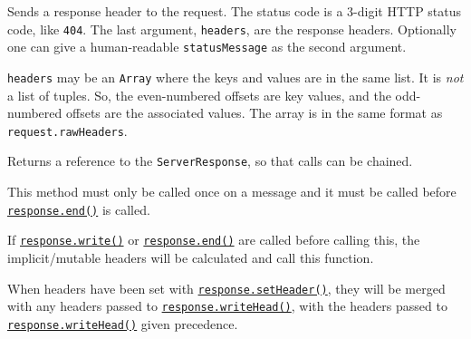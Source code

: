 Sends a response header to the request. The status code is a 3-digit
HTTP status code, like \texttt{404}. The last argument,
\texttt{headers}, are the response headers. Optionally one can give a
human-readable \texttt{statusMessage} as the second argument.

\texttt{headers} may be an \texttt{Array} where the keys and values are
in the same list. It is \emph{not} a list of tuples. So, the
even-numbered offsets are key values, and the odd-numbered offsets are
the associated values. The array is in the same format as
\texttt{request.rawHeaders}.

Returns a reference to the \texttt{ServerResponse}, so that calls can be
chained.

\begin{Shaded}
\begin{Highlighting}[]
\OperatorTok{=} \OperatorTok{;}
  \NormalTok{(}\OperatorTok{,}\NormalTok{ \{}
    \OperatorTok{:} \OperatorTok{,}
    \OperatorTok{:} \OperatorTok{,}
\NormalTok{  \})}
  \OperatorTok{;}
\end{Highlighting}
\end{Shaded}

This method must only be called once on a message and it must be called
before
\hyperref[responseenddata-encoding-callback]{\texttt{response.end()}} is
called.

If
\hyperref[responsewritechunk-encoding-callback]{\texttt{response.write()}}
or \hyperref[responseenddata-encoding-callback]{\texttt{response.end()}}
are called before calling this, the implicit/mutable headers will be
calculated and call this function.

When headers have been set with
\hyperref[responsesetheadername-value]{\texttt{response.setHeader()}},
they will be merged with any headers passed to
\hyperref[responsewriteheadstatuscode-statusmessage-headers]{\texttt{response.writeHead()}},
with the headers passed to
\hyperref[responsewriteheadstatuscode-statusmessage-headers]{\texttt{response.writeHead()}}
given precedence.

